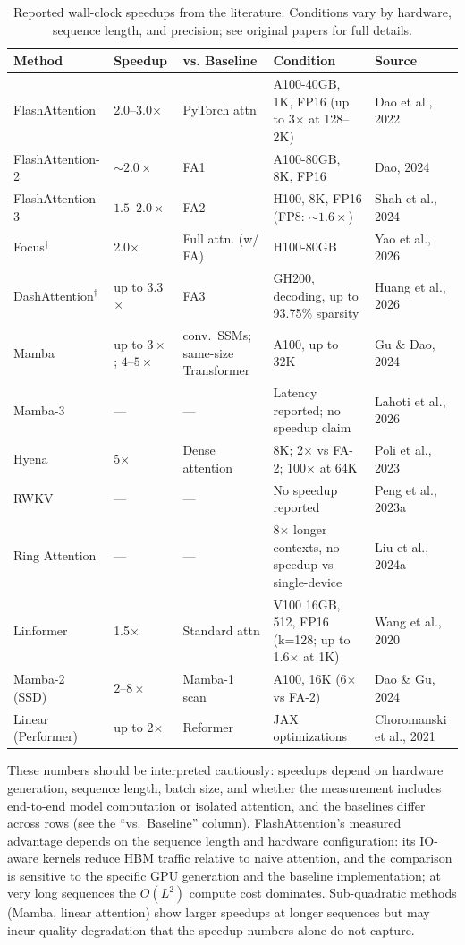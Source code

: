 \documentclass[10pt,twocolumn]{article}
\newif\ifshrinkfloats
\newcommand{\sflt}[2]{\ifshrinkfloats#1\else#2\fi}
\begin{document}
\begin{table}[!tbp]
\centering
\sflt{\fontsize{11}{13.2}\selectfont}{\footnotesize}
\renewcommand{\arraystretch}{\sflt{1.8}{2.6}}
\caption{Reported wall-clock speedups from the literature. Conditions vary by hardware, sequence length, and precision; see original papers for full details.}
\label{tab:speedups}
\begin{tabular}{p{2.5cm}p{1.5cm}p{2.2cm}p{2.8cm}p{1.6cm}}
\toprule
Method & Speedup & vs. Baseline & Condition & Source \\
\midrule
FlashAttention & 2.0--3.0$\times$ & PyTorch attn & A100-40GB, 1K, FP16 (up to 3$\times$ at 128--2K) & Dao et al., 2022 \\
FlashAttention-2 & $\sim2.0\times$ & FA1 & A100-80GB, 8K, FP16 & Dao, 2024 \\
FlashAttention-3 & $1.5\text{--}2.0\times$ & FA2 & H100, 8K, FP16 (FP8: $\sim1.6\times$) & Shah et al., 2024 \\
Focus$^\dagger$ & 2.0$\times$ & Full attn. (w/ FA) & H100-80GB & Yao et al., 2026 \\
DashAttention$^\dagger$ & up to 3.3$\times$ & FA3 & GH200, decoding, up to 93.75\% sparsity & Huang et al., 2026 \\
Mamba & up to $3\times$; $4$--$5\times$ & conv.\ SSMs; same-size Transformer & A100, up to 32K & Gu \& Dao, 2024 \\
Mamba-3 & --- & --- & Latency reported; no speedup claim & Lahoti et al., 2026 \\
Hyena & 5$\times$ & Dense attention & 8K; 2$\times$ vs FA-2; 100$\times$ at 64K & Poli et al., 2023 \\
RWKV & --- & --- & No speedup reported & Peng et al., 2023a \\
Ring Attention & --- & --- & 8$\times$ longer contexts, no speedup vs single-device & Liu et al., 2024a \\
Linformer & 1.5$\times$ & Standard attn & V100 16GB, 512, FP16 (k=128; up to 1.6$\times$ at 1K) & Wang et al., 2020 \\
Mamba-2 (SSD) & $2$--$8\times$ & Mamba-1 scan & A100, 16K (6$\times$ vs FA-2) & Dao \& Gu, 2024 \\
Linear (Performer) & up to 2$\times$ & Reformer & JAX optimizations & Choromanski et al., 2021 \\
\bottomrule
\end{tabular}
\end{table}

These numbers should be interpreted cautiously: speedups depend on hardware generation, sequence length, batch size, and whether the measurement includes end-to-end model computation or isolated attention, and the baselines differ across rows (see the ``vs.\ Baseline'' column). FlashAttention's measured advantage depends on the sequence length and hardware configuration: its IO-aware kernels reduce HBM traffic relative to naive attention, and the comparison is sensitive to the specific GPU generation and the baseline implementation; at very long sequences the $O(L^2)$ compute cost dominates. Sub-quadratic methods (Mamba, linear attention) show larger speedups at longer sequences but may incur quality degradation that the speedup numbers alone do not capture.
\end{document}

